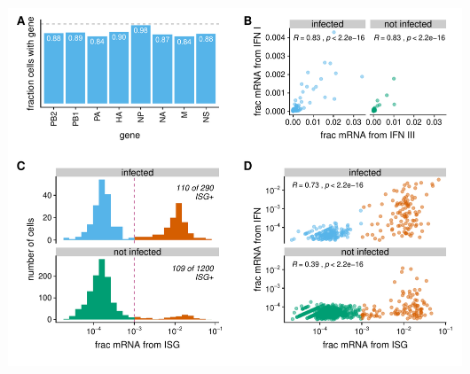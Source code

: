 \documentclass[10pt,letterpaper]{article}
\newcommand{\FIG}[1]{\autoref{fig:#1}}
\begin{document}
\begin{suppfig}
\includegraphics[width=0.9\textwidth]{figures/single_cell_figures/p_cell_summary_supp.pdf}
\caption{
{\bf Additional plots from analysis of transcriptomic data, related to \FIG{transcriptomics}.}
{\bf (A)}
Fraction of infected cells that are called as expressing each viral gene.
The gray dashed line is at one.
Each gene is detected in $\sim$80-90\% of cells, roughly in line with prior estimates~\citep{brooke2013most, heldt2015single, dou2017analysis, russell2018extreme}.
The exception is NP, which is detected in virtually all infected cells.
The higher frequency of detecting NP could reflect a biological phenomenon, but we suspect it is more likely that cells lacking NP tend to have lower viral gene expression and so are not reliably called as infected in our experiments because the number of viral mRNAs is below the detection limit.
{\bf (B)}
Correlation between the fraction of cellular mRNA derived from type I and type III IFN in the A549 cells in our single-cell transcriptomics.
Each point represents one cell.
The plots are faceted by whether the cells are called as infected, and the Pearson correlation coefficient is shown.
{\bf (C)}
Distribution of ISGs expression across single infected and uninfected cells. 
For each cell, we quantified ISG expression as the total fraction of cellular mRNAs derived from four prototypical ISGs (IFIT1, ISG15, CCL5, and Mx1). 
We heuristically classify as ISG+ cells with $>10^{-3}$ of their cellular mRNA from these ISGs, and color these cells red.
Comparison to \FIG{transcriptomics}G shows that more cells are ISG+ than IFN+, probably because paracrine signaling can induce ISG expression in cells that do not themselves express IFN~\citep{stetson2006type,honda2006type}.
{\bf (D)} 
Correlation between the fraction of cellular mRNA derived from IFN and ISGs.
Each point is one cell, and the Pearson correlation coefficient is shown.
IFN and ISG expression are more correlated for infected than uninfected cells, probably because in the latter the ISG expression is more often due to paracrine signaling that does not induce expression of IFN itself.
Among both the infected and uninfected populations, there are many cells that express ISGs but not IFN, but no cells that express IFN but not ISGs.
}
\label{suppfig:transcriptomics_supp}
\end{suppfig}
\end{document}

